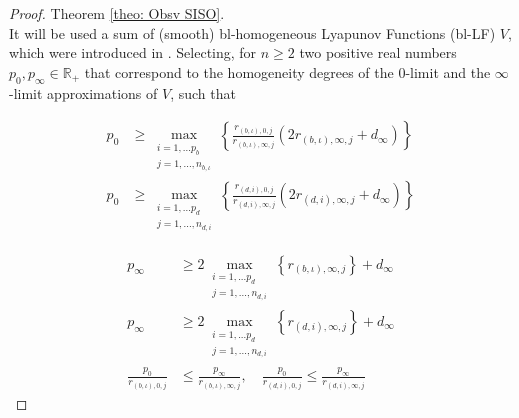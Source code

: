 \documentclass[11pt,letterpaper,twoside,openright]{report}
\newcommand{\RE}{\mathbb{R}}
\begin{document}
\begin{proof}{Theorem \ref{theo: Obsv SISO}. \\}
	It will be used a sum of (smooth) bl-homogeneous Lyapunov Functions (bl-LF) $V$, which were introduced in \cite{Moreno2021}. Selecting, for $n \geq 2$ two positive real numbers $p_0,p_{\infty}\in \RE_+$ that correspond to the homogeneity degrees of the $0$-limit and the $\infty$-limit approximations of $V$, such that
	
	\begin{equation}
		\begin{split}\label{ecu: CH4 cond p0}
			p_0 &\geq \max\limits_{ \begin{array}{c} i=1,...p_b\\j=1,...,n_{b,\iota} \end{array} } \left\lbrace \frac{r_{(b,\iota),0,j} }{r_{(b,\iota),\infty,j}} \left( 2r_{(b,\iota),\infty,j} + d_{\infty} \right)  \right\rbrace \\
						p_0 &\geq \max\limits_{ \begin{array}{c} i=1,...p_d\\j=1,...,n_{d,i} \end{array} } \left\lbrace \frac{r_{(d,i),0,j} }{r_{(d,i),\infty,j}} \left( 2r_{(d,i),\infty,j} + d_{\infty} \right)  \right\rbrace 
		\end{split}
	\end{equation}

	\begin{equation}
	\begin{split}\label{ecu: CH4 cond pinf}
		p_\infty &\geq 2 \max\limits_{ \begin{array}{c} i=1,...p_d\\j=1,...,n_{d,i} \end{array} } \left\lbrace r_{(b,\iota),\infty,j} \right\rbrace + d_{\infty} \\
p_\infty &\geq 2 \max\limits_{ \begin{array}{c} i=1,...p_d\\j=1,...,n_{d,i} \end{array} } \left\lbrace r_{(d,i),\infty,j} \right\rbrace + d_{\infty} \\
		\frac{p_0}{r_{(b,\iota),0,j}} &\leq \frac{p_\infty}{r_{(b,\iota),\infty,j}}, \quad \frac{p_0}{r_{(d,i),0,j}} \leq \frac{p_\infty}{r_{(d,i),\infty,j}}
		\end{split}
\end{equation}


\end{proof}
\end{document}
